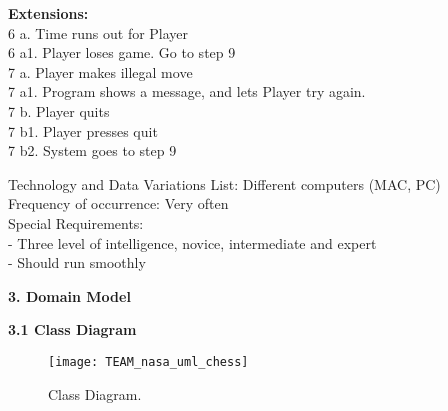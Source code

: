 \documentclass{article}
\begin{document}
\begin{flushleft}
\textbf{Extensions:}\\
6 a. Time runs out for Player\\
6 a1. Player loses game. Go to step 9\\
7 a. Player makes illegal move\\
7 a1. Program shows a message, and lets Player try again.\\
7 b. Player quits\\
7 b1. Player presses quit\\
7 b2. System goes to step 9\\
\vspace{3mm}

Technology and Data Variations List:\hspace{3mm} Different computers (MAC, PC)\\
Frequency of occurrence:\hspace{3mm} Very often\\
Special Requirements:\\
\hspace{5mm} - Three level of intelligence, novice, intermediate and expert\\
\hspace{5mm} - Should run smoothly\\
\vspace{10mm}

\vspace{10mm}

\newpage
\begin{Large}\textbf{3.	Domain Model}\\	
\end{Large}
\vspace{3mm}
\textbf{3.1	Class Diagram}

\begin{figure}[h]
	\texttt{[image: TEAM\_nasa\_uml\_chess]}
	\caption{Class Diagram.}	
\end{figure}





	
\end{flushleft}



	
	
		
\end{document}
